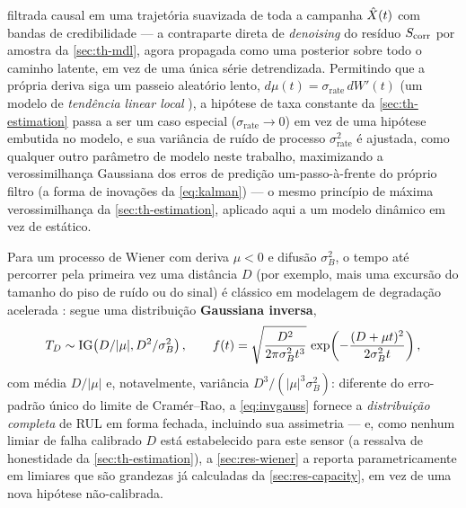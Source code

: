 filtrada causal em uma trajetória suavizada de toda a campanha
$\hat{X}(t)$ com bandas de credibilidade --- a contraparte direta de
\emph{denoising} do resíduo $S_{\mathrm{corr}}$ por amostra da \cref{sec:th-mdl}, agora
propagada como uma posterior sobre todo o caminho latente, em vez de uma
única série detrendizada. Permitindo que a própria deriva siga um passeio
aleatório lento, $d\mu(t)=\sigma_{\mathrm{rate}}\,dW'(t)$ (um modelo de
\emph{tendência linear local} \cite{harvey1989}), a hipótese de taxa
constante da \cref{sec:th-estimation} passa a ser um caso especial
($\sigma_{\mathrm{rate}}\to0$) em vez de uma hipótese embutida no modelo, e
sua variância de ruído de processo $\sigma_{\mathrm{rate}}^2$ é ajustada,
como qualquer outro parâmetro de modelo neste trabalho, maximizando a
verossimilhança Gaussiana dos erros de predição um-passo-à-frente do próprio
filtro (a forma de inovações da \cref{eq:kalman}) --- o mesmo princípio de
máxima verossimilhança da \cref{sec:th-estimation}, aplicado aqui a um
modelo dinâmico em vez de estático.

Para um processo de Wiener com deriva $\mu<0$ e difusão $\sigma_B^2$, o
tempo até percorrer pela primeira vez uma distância $D$ (por exemplo, mais
uma excursão do tamanho do piso de ruído ou do sinal) é clássico em
modelagem de degradação acelerada \cite{whitmore1997,si2011}: segue uma
distribuição \textbf{Gaussiana inversa},
\begin{equation}
  T_D \sim \mathrm{IG}\!\left(D/|\mu|,D^2/\sigma_B^2\right), \qquad
  f(t) = \sqrt{\frac{D^2}{2\pi\sigma_B^2 t^3}}\,
         \exp\!\left(-\frac{(D+\mu t)^2}{2\sigma_B^2 t}\right),
  \label{eq:invgauss}
\end{equation}
com média $D/|\mu|$ e, notavelmente, variância
$D^3/(|\mu|^3\sigma_B^2)$: diferente do erro-padrão único do limite de
Cram\'er--Rao, a \cref{eq:invgauss} fornece a \emph{distribuição completa} de
RUL em forma fechada, incluindo sua assimetria --- e, como nenhum limiar de
falha calibrado $D$ está estabelecido para este sensor (a ressalva de
honestidade da \cref{sec:th-estimation}), a \cref{sec:res-wiener} a reporta
parametricamente em limiares que são grandezas já calculadas da
\cref{sec:res-capacity}, em vez de uma nova hipótese não-calibrada.
